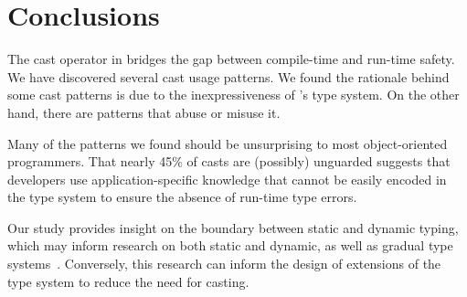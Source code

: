 \section{Conclusions}\label{sec:casts:conclusions}

The cast operator in \java{} bridges the gap between compile-time and run-time safety.
We have discovered several cast usage patterns.
We found the rationale behind some cast patterns is due to the inexpressiveness of \java{}'s type system.
On the other hand,
there are patterns that abuse or misuse it.

Many of the patterns we found should be unsurprising to most object-oriented programmers.
That nearly 45\% of casts are (possibly) unguarded 
suggests that developers use application-specific knowledge that cannot be easily encoded in
the type system to ensure the absence of run-time type errors.

Our study provides insight on the boundary between static and dynamic typing,
which may inform research on both static and dynamic,
as well as gradual type systems~\citep{Siek06gradualtyping}.
Conversely, this research can inform the design of extensions of the \java{} type system to reduce the need for casting.

